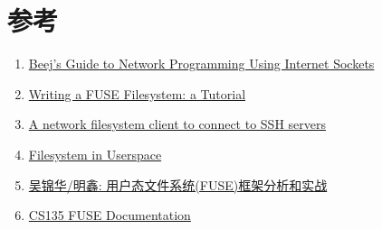 \section{参考}

\begin{enumerate}
    \item \href{https://beej.us/guide/bgnet/}{Beej's Guide to Network Programming Using Internet Sockets}
    \item \href{https://www.cs.nmsu.edu/~pfeiffer/fuse-tutorial/}{Writing a FUSE Filesystem: a Tutorial}
    \item \href{https://github.com/libfuse/sshfs}{A network filesystem client to connect to SSH servers}
    \item \href{https://en.wikipedia.org/wiki/Filesystem_in_Userspace}{Filesystem in Userspace} 
    \item \href{https://blog.csdn.net/juS3Ve/article/details/78237236}{吴锦华/明鑫: 用户态文件系统(FUSE)框架分析和实战} 
    \item \href{https://www.cs.hmc.edu/~geoff/classes/hmc.cs135.201109/homework/fuse/fuse_doc.html}{CS135 FUSE Documentation}
\end{enumerate}

\label{last_page_num}

